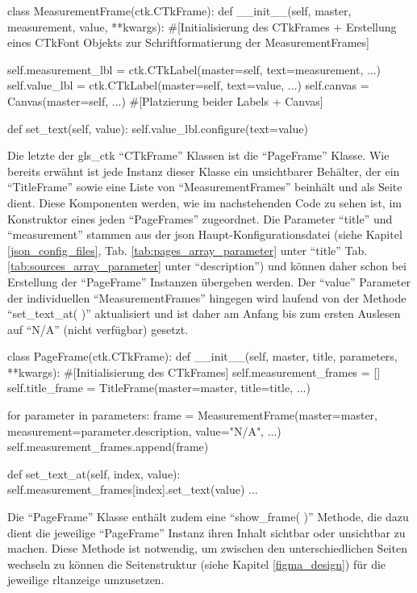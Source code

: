 \begin{pythoncode}
class MeasurementFrame(ctk.CTkFrame):
	def __init__(self, master, measurement, value, **kwargs):
		#[Initialisierung des CTkFrames + Erstellung eines CTkFont Objekts zur Schriftformatierung der MeasurementFrames]
		
		self.measurement_lbl = ctk.CTkLabel(master=self, text=measurement, ...)
		self.value_lbl = ctk.CTkLabel(master=self, text=value, ...)
		self.canvas = Canvas(master=self, ...)
		#[Platzierung beider Labels + Canvas]
		
	def set_text(self, value):
		self.value_lbl.configure(text=value)
\end{pythoncode}

Die letzte der \gls{gls_ctk} \enquote{CTkFrame} Klassen ist die \enquote{PageFrame} Klasse. Wie bereits erwähnt ist jede Instanz dieser Klasse ein unsichtbarer Behälter, der ein \enquote{TitleFrame} sowie eine Liste von \enquote{MeasurementFrames} beinhält und als Seite dient. Diese Komponenten werden, wie im nachstehenden Code zu sehen ist, im Konstruktor eines jeden \enquote{PageFrames} zugeordnet. Die Parameter \enquote{title} und \enquote{measurement} stammen aus der \acs{json} Haupt-Konfigurationsdatei (siehe Kapitel \ref{json_config_files}, Tab. \ref{tab:pages_array_parameter} unter \enquote{title} \bzw Tab. \ref{tab:sources_array_parameter}  unter \enquote{description}) und können daher schon bei Erstellung der \enquote{PageFrame} Instanzen übergeben werden. Der \enquote{value} Parameter der individuellen \enquote{MeasurementFrames} hingegen wird laufend von der Methode \enquote{set\_text\_at( )} aktualisiert und ist daher am Anfang bis zum ersten Auslesen auf \enquote{N/A} (\dt nicht verfügbar) gesetzt.
	
\begin{pythoncode}
class PageFrame(ctk.CTkFrame):
	def __init__(self, master, title, parameters, **kwargs):
		#[Initialisierung des CTkFrames]
		self.measurement_frames = []
		self.title_frame = TitleFrame(master=master, title=title, ...)
		
		for parameter in parameters:
			frame = MeasurementFrame(master=master, measurement=parameter.description, value="N/A", ...)
			self.measurement_frames.append(frame)

    def set_text_at(self, index, value):
        self.measurement_frames[index].set_text(value)
...
\end{pythoncode}

Die \enquote{PageFrame} Klasse enthält zudem eine \enquote{show\_frame( )} Methode, die dazu dient die jeweilige \enquote{PageFrame} Instanz \bzw ihren Inhalt sichtbar oder unsichtbar zu machen. Diese Methode ist notwendig, um zwischen den unterschiedlichen Seiten wechseln zu können \bzw die Seitenstruktur (siehe Kapitel \ref{figma_design}) für die jeweilige \acs{rltanzeige} umzusetzen.

